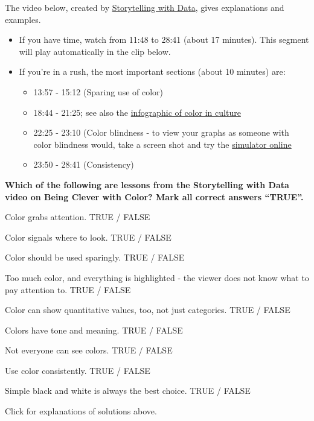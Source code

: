 \documentclass[
  letterpaper,
  DIV=11,
  numbers=noendperiod]{scrreprt}
\providecommand{\tightlist}{%
  \setlength{\itemsep}{0pt}\setlength{\parskip}{0pt}}\usepackage{longtable,booktabs,array}
\theoremstyle{remark}
\begin{document}
The video below, created by
\href{https://www.youtube.com/c/storytellingwithdata}{Storytelling with
Data}, gives explanations and examples.

\begin{itemize}
\tightlist
\item
  If you have time, watch from 11:48 to 28:41 (about 17 minutes). This
  segment will play automatically in the clip below.
\item
  If you're in a rush, the most important sections (about 10 minutes)
  are:

  \begin{itemize}
  \tightlist
  \item
    13:57 - 15:12 (Sparing use of color)
  \item
    18:44 - 21:25; see also the
    \href{https://www.informationisbeautiful.net/visualizations/colours-in-cultures/}{infographic
    of color in culture}
  \item
    22:25 - 23:10 (Color blindness - to view your graphs as someone with
    color blindness would, take a screen shot and try the
    \href{https://www.color-blindness.com/coblis-color-blindness-simulator/}{simulator
    online}
  \item
    23:50 - 28:41 (Consistency)
  \end{itemize}
\end{itemize}

\textbf{Which of the following are lessons from the Storytelling with
Data video on Being Clever with Color? Mark all correct answers
``TRUE''.}

Color grabs attention. TRUE / FALSE

Color signals where to look. TRUE / FALSE

Color should be used sparingly. TRUE / FALSE

Too much color, and everything is highlighted - the viewer does not know
what to pay attention to. TRUE / FALSE

Color can show quantitative values, too, not just categories. TRUE /
FALSE

Colors have tone and meaning. TRUE / FALSE

Not everyone can see colors. TRUE / FALSE

Use color consistently. TRUE / FALSE

Simple black and white is always the best choice. TRUE / FALSE

Click for explanations of solutions above.
\end{document}
